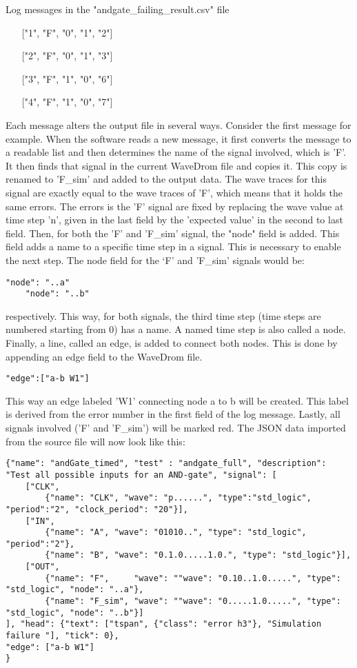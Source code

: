 \begin{customenv}
	\caption{Log messages in the "andgate\_failing\_result.csv" file}
	\begin{itemize}
		\centering
		\item [] ["1", "F", "0", "1", "2"]
		\item [] ["2", "F", "0", "1", "3"]
		\item [] ["3", "F", "1", "0", "6"]
		\item [] ["4", "F", "1", "0", "7"]
	\end{itemize}
\end{customenv}\newpage\noindent
Each message alters the output file in several ways. Consider the first message for example. When the software reads a new message, it first converts the message to a readable list and then determines the name of the signal involved, which is 'F'. It then finds that signal in the current WaveDrom file and copies it. This copy is renamed to 'F\_sim' and added to the output data. The wave traces for this signal are exactly equal to the wave traces of 'F', which means that it holds the same errors. The errors is the 'F' signal are fixed by replacing the wave value at time step 'n', given in the last field by the 'expected value' in the second to last field. 
\npar
Then, for both the 'F' and 'F\_sim' signal, the "node" field is added. This field adds a name to a specific time step in a signal. This is necessary to enable the next step. The node field for the ‘F’ and 'F\_sim' signals would be:
\begin{lstlisting}[style=json]
	"node": "..a"
	"node": "..b"
\end{lstlisting}\noindent
respectively. This way, for both signals, the third time step (time steps are numbered starting from 0) has a name. A named time step is also called a node.
\npar
Finally, a line, called an edge, is added to connect both nodes. This is done by appending an edge field to the WaveDrom file.
\begin{lstlisting}[style=json]
"edge":["a-b W1"]
\end{lstlisting}\noindent
This way an edge labeled 'W1' connecting node a to b will be created. This label is derived from the error number in the first field of the log message.
\npar
Lastly, all signals involved ('F' and 'F\_sim') will be marked red.
\newpage\noindent
The JSON data imported from the source file will now look like this:
\begin{lstlisting}[style=json, caption={Temporary content of the result file of a failing AND-gate example}, label={json:andgate_failing_part}]
{"name": "andGate_timed", "test" : "andgate_full", "description": "Test all possible inputs for an AND-gate", "signal": [
	["CLK",
		{"name": "CLK", "wave": "p......", "type":"std_logic", "period":"2", "clock_period": "20"}],
	["IN",
		{"name": "A", "wave": "01010..", "type": "std_logic", "period":"2"},
		{"name": "B", "wave": "0.1.0.....1.0.", "type": "std_logic"}],
	["OUT",
		{"name": "F",     "wave": ""wave": "0.10..1.0.....", "type": "std_logic", "node": "..a"},
		{"name": "F_sim", "wave": ""wave": "0.....1.0.....", "type": "std_logic", "node": "..b"}]
], "head": {"text": ["tspan", {"class": "error h3"}, "Simulation failure "], "tick": 0}, 
"edge": ["a-b W1"]
}
\end{lstlisting}\noindent
